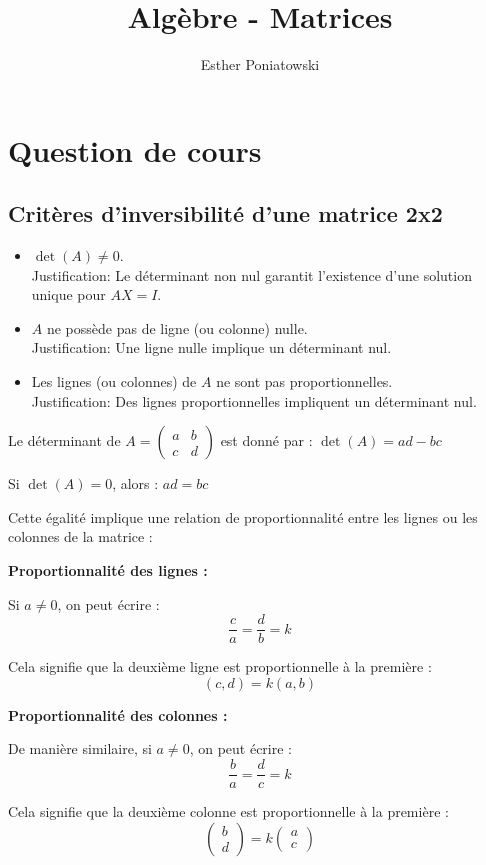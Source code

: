 \documentclass[10pt,a4paper]{article}
\title{Algèbre - Matrices}
\author{Esther Poniatowski}
\date{}
\begin{document}
\maketitle

\section*{Question de cours}

\subsection*{Critères d'inversibilité d'une matrice 2x2}

\begin{itemize}
    \item $\det(A) \neq 0$. \\
    Justification: Le déterminant non nul garantit l'existence d'une solution unique pour $AX = I$.
    \item $A$ ne possède pas de ligne (ou colonne) nulle.\\
    Justification: Une ligne nulle implique un déterminant nul.
    \item Les lignes (ou colonnes) de $A$ ne sont pas proportionnelles.\\
    Justification: Des lignes proportionnelles impliquent un déterminant nul.
\end{itemize}

Le déterminant de $A = \begin{pmatrix} a & b \\ c & d \end{pmatrix}$ est donné par :
$ \det(A) = ad - bc $

Si $\det(A) = 0$, alors : $ ad = bc $

Cette égalité implique une relation de proportionnalité entre les lignes ou les colonnes de la matrice :

\textbf{Proportionnalité des lignes :}

Si $a \neq 0$, on peut écrire :
$$ \frac{c}{a} = \frac{d}{b} = k $$

Cela signifie que la deuxième ligne est proportionnelle à la première :
$$ (c,d) = k(a,b) $$

\textbf{Proportionnalité des colonnes :}

De manière similaire, si $a \neq 0$, on peut écrire :
$$ \frac{b}{a} = \frac{d}{c} = k $$

Cela signifie que la deuxième colonne est proportionnelle à la première :
$$ \begin{pmatrix} b \\ d \end{pmatrix} = k\begin{pmatrix} a \\ c \end{pmatrix} $$
\end{document}
